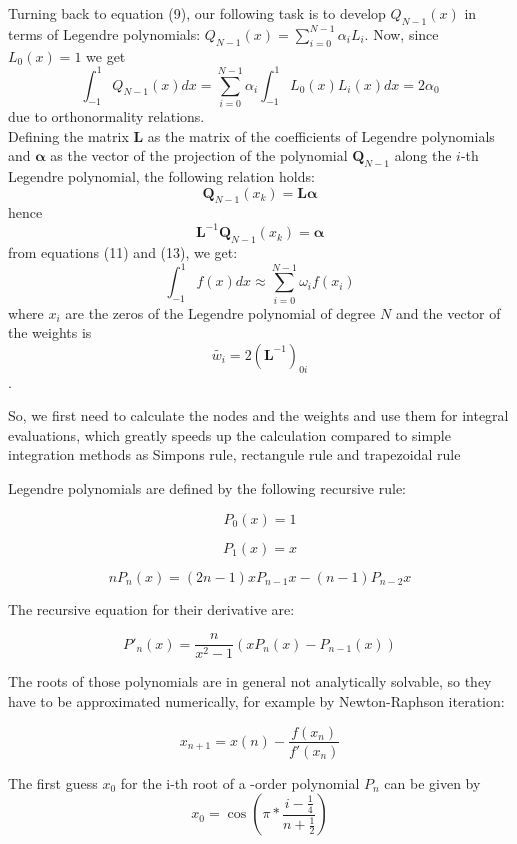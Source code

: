 \documentclass[9pt,a4paper,titlepage]{article}
\begin{document}
Turning back to equation (9), our following task is to develop $Q_{N-1}(x)$ in terms of Legendre polynomials: $Q_{N-1}(x) = \sum_{i=0}^{N-1}\alpha_{i}L_{i}$. Now, since $L_0(x)=1$ we get 
\begin{equation}
\int_{-1}^{1}Q_{N-1}(x)dx=\sum_{i=0}^{N-1}\alpha_{i}\int_{-1}^{1}L_{0}(x)L_{i}(x)dx=2\alpha_{0}
\end{equation}
due to orthonormality relations.
\\Defining the matrix $\textbf{L}$ as the matrix of the coefficients of Legendre polynomials and $\boldsymbol\alpha$ as the vector of the projection of the polynomial $\textbf{Q} _{N-1}$ along the $i$-th Legendre polynomial, the following relation holds:
\begin{equation}
\textbf{Q} _{N-1}(x_{k})=\textbf{L}\boldsymbol\alpha
\end{equation}
hence
\begin{equation}
\textbf{L} ^{-1}\textbf{Q} _{N-1}(x_{k})=\boldsymbol\alpha
\end{equation}
from equations (11) and (13), we get:
\begin{equation}
\int_{-1}^{1}f(x)dx\approx \sum_{i=0}^{N-1}\omega_{i}f(x_{i})
\end{equation}
where $x_{i}$ are the zeros of the Legendre polynomial of degree $N$ and the vector of the weights is $$\tilde{w_i}=2(\textbf{L}^{-1})_{0i}$$. 

So, we first need to calculate the nodes and the weights and use them  for integral evaluations, which greatly speeds up the calculation compared to simple integration methods as Simpons rule, rectangule rule and trapezoidal rule

Legendre polynomials are defined by the following recursive rule:

$$P_0(x)=1$$

$$P_1(x)=x$$

$$nP_n(x)=(2n-1)xP_{n-1}x-(n-1)P_{n-2}x$$


The recursive equation for their derivative are:

$$P'_n(x)=\frac{n}{x^2-1}(xP_n(x)-P_{n-1}(x))$$

The roots of those polynomials are in general not analytically solvable, so they have to be approximated numerically, for example by Newton-Raphson iteration:

$$x_{n+1}=x(n)-\frac{f(x_n)}{f'(x_n)}$$

The first guess $ x_{0}$ for the i-th root of a  -order polynomial $ P_{n}$ can be given by
$$x_0=\cos(\pi*\frac{i-\frac{1}{4}}{n+\frac{1}{2}})$$
\end{document}
